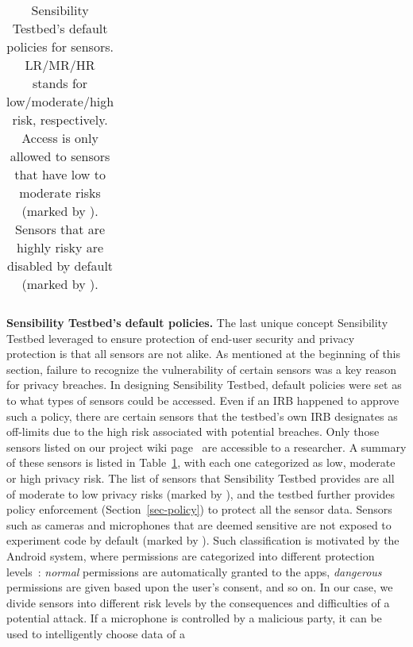 \begin{table}
\begin{tabular}{|l|c|c|c|}
\end{tabular}
\egroup

\caption{\small Sensibility Testbed's default policies for sensors. LR/MR/HR
stands for low/moderate/high risk, respectively. Access is only allowed to sensors that have low to 
moderate risks (marked by \tickmark). Sensors that are highly risky are 
disabled by default (marked by \xmark).}
\label{tab:default}
\end{table}

\textbf{Sensibility Testbed's default policies.} %
The last unique concept Sensibility Testbed leveraged to ensure 
protection of end-user security and privacy protection is that all sensors 
are not alike. As mentioned at the beginning of this section, failure to 
recognize the vulnerability of certain sensors was a key reason for privacy 
breaches. In designing Sensibility Testbed, default policies were set as 
to what types of sensors could be accessed. Even if an IRB happened 
to approve such a policy, there are certain sensors that the testbed's
own IRB designates as off-limits due to the high risk associated with 
potential breaches. 
Only those sensors listed on our project 
wiki page~\cite{sensor-api} are accessible to a researcher. 
A summary of these sensors is listed in Table~\ref{tab:default}, 
with each one categorized as low, moderate or high 
privacy risk. The list of sensors that Sensibility Testbed provides are all of moderate 
to low privacy risks (marked by \tickmark), and the testbed further provides policy enforcement
(Section~\ref{sec-policy}) to protect all the sensor data. Sensors 
such as cameras and microphones that are deemed sensitive are not 
exposed to experiment code by default (marked by \xmark). Such 
classification is motivated by the Android system, where 
permissions are categorized into different protection levels~\cite{level}:
\textit{normal} permissions are automatically granted to the apps, 
\textit{dangerous} permissions are given based upon the 
user's consent, and so on. In our case, 
we divide sensors into different risk levels by the consequences and 
difficulties of a potential attack. If a microphone is controlled by 
a malicious party, it can be used to intelligently choose data of a 
